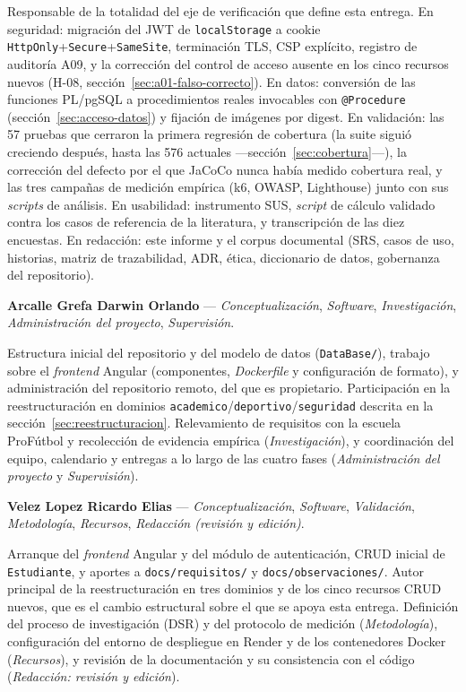\documentclass[11pt,a4paper]{article}
\newcommand{\ruta}[1]{\texttt{\footnotesize #1}}
\begin{document}
Responsable de la totalidad del eje de verificación que define esta
entrega. En seguridad: migración del JWT de \texttt{localStorage} a cookie
\texttt{HttpOnly}+\texttt{Secure}+\texttt{SameSite}, terminación TLS,
CSP explícito, registro de auditoría A09, y la corrección del control de
acceso ausente en los cinco recursos nuevos (H-08,
sección~\ref{sec:a01-falso-correcto}). En datos: conversión de las
funciones PL/pgSQL a procedimientos reales invocables con
\texttt{@Procedure} (sección~\ref{sec:acceso-datos}) y fijación de
imágenes por digest. En validación: las 57 pruebas que cerraron la
primera regresión de cobertura (la suite siguió creciendo después, hasta
las 576 actuales —sección~\ref{sec:cobertura}—), la corrección del defecto
por el que JaCoCo nunca había medido cobertura real, y las tres campañas
de medición empírica (k6, OWASP, Lighthouse) junto con sus \emph{scripts}
de análisis. En usabilidad: instrumento SUS, \emph{script} de cálculo
validado contra los casos de referencia de la literatura, y transcripción
de las diez encuestas. En redacción: este informe y el corpus documental
(SRS, casos de uso, historias, matriz de trazabilidad, ADR, ética,
diccionario de datos, gobernanza del repositorio).

\textbf{Arcalle Grefa Darwin Orlando} — \emph{Conceptualización},
\emph{Software}, \emph{Investigación}, \emph{Administración del proyecto},
\emph{Supervisión}.

Estructura inicial del repositorio y del modelo de datos
(\texttt{DataBase/}), trabajo sobre el \emph{frontend} Angular
(componentes, \emph{Dockerfile} y configuración de formato), y
administración del repositorio remoto, del que es propietario.
Participación en la reestructuración en dominios
\texttt{academico}/\texttt{deportivo}/\texttt{seguridad} descrita en la
sección~\ref{sec:reestructuracion}. Relevamiento de requisitos con la
escuela ProFútbol y recolección de evidencia empírica (\emph{Investigación}),
y coordinación del equipo, calendario y entregas a lo largo de las cuatro
fases (\emph{Administración del proyecto} y \emph{Supervisión}).

\textbf{Velez Lopez Ricardo Elias} — \emph{Conceptualización},
\emph{Software}, \emph{Validación}, \emph{Metodología}, \emph{Recursos},
\emph{Redacción (revisión y edición)}.

Arranque del \emph{frontend} Angular y del módulo de autenticación, CRUD
inicial de \texttt{Estudiante}, y aportes a \ruta{docs/requisitos/} y
\ruta{docs/observaciones/}. Autor principal de la reestructuración en tres
dominios y de los cinco recursos CRUD nuevos, que es el cambio estructural
sobre el que se apoya esta entrega. Definición del proceso de
investigación (DSR) y del protocolo de medición (\emph{Metodología}),
configuración del entorno de despliegue en Render y de los contenedores
Docker (\emph{Recursos}), y revisión de la documentación y su consistencia
con el código (\emph{Redacción: revisión y edición}).
\end{document}
